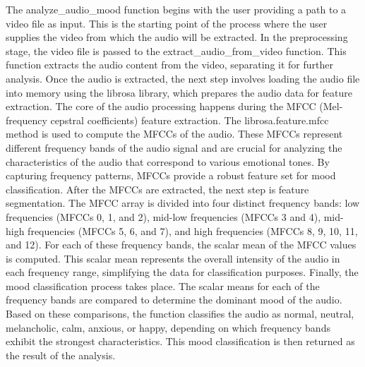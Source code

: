 \noindent
The analyze\_audio\_mood function begins with the user providing a path to a video file as input. This is the starting point of the process where the user supplies the video from which the audio will be extracted. In the preprocessing stage, the video file is passed to the extract\_audio\_from\_video function. This function extracts the audio content from the video, separating it for further analysis. Once the audio is extracted, the next step involves loading the audio file into memory using the librosa library, which prepares the audio data for feature extraction. The core of the audio processing happens during the MFCC (Mel-frequency cepstral coefficients) feature extraction. The librosa.feature.mfcc method is used to compute the MFCCs of the audio. These MFCCs represent different frequency bands of the audio signal and are crucial for analyzing the characteristics of the audio that correspond to various emotional tones. By capturing frequency patterns, MFCCs provide a robust feature set for mood classification. After the MFCCs are extracted, the next step is feature segmentation. The MFCC array is divided into four distinct frequency bands: low frequencies (MFCCs 0, 1, and 2), mid-low frequencies (MFCCs 3 and 4), mid-high frequencies (MFCCs 5, 6, and 7), and high frequencies (MFCCs 8, 9, 10, 11, and 12). For each of these frequency bands, the scalar mean of the MFCC values is computed. This scalar mean represents the overall intensity of the audio in each frequency range, simplifying the data for classification purposes. Finally, the mood classification process takes place. The scalar means for each of the frequency bands are compared to determine the dominant mood of the audio. Based on these comparisons, the function classifies the audio as normal, neutral, melancholic, calm, anxious, or happy, depending on which frequency bands exhibit the strongest characteristics. This mood classification is then returned as the result of the analysis.

\vspace{1em}

